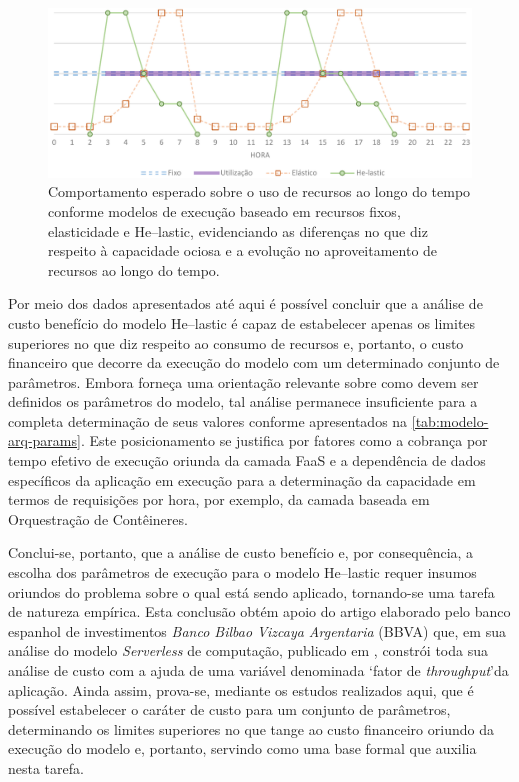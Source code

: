 \documentclass[english,brazilian]{UNISINOSmonografia} %
\newcommand\defaultFigureWidth{0.9}
\begin{document}
\begin{figure}[tb]
	\centering%
	\begin{minipage}{\defaultFigureWidth\textwidth}
		\caption{Comportamento esperado sobre o uso de recursos ao longo do tempo conforme modelos de execução baseado em recursos fixos, elasticidade e \textsf{He}--lastic, evidenciando as diferenças no que diz respeito à capacidade ociosa e a evolução no aproveitamento de recursos ao longo do tempo.}
		\label{fig:modelo-custben-alternativas}
		\includegraphics[width=\textwidth]{modelo-custben-alternativas}
	\end{minipage}
\end{figure}


Por meio dos dados apresentados até aqui é possível concluir que a análise de custo benefício do modelo \textsf{He}--lastic é capaz de estabelecer apenas os limites superiores no que diz respeito ao consumo de recursos e, portanto, o custo financeiro que decorre da execução do modelo com um determinado conjunto de parâmetros.
Embora forneça uma orientação relevante sobre como devem ser definidos os parâmetros do modelo, tal análise permanece insuficiente para a completa determinação de seus valores conforme apresentados na \autoref{tab:modelo-arq-params}.
Este posicionamento se justifica por fatores como a cobrança por tempo efetivo de execução oriunda da camada FaaS e a dependência de dados específicos da aplicação em execução para a determinação da capacidade em termos de requisições por hora, por exemplo, da camada baseada em Orquestração de Contêineres.


Conclui-se, portanto, que a análise de custo benefício e, por consequência, a escolha dos parâmetros de execução para o modelo \textsf{He}--lastic requer insumos oriundos do problema sobre o qual está sendo aplicado, tornando-se uma tarefa de natureza empírica.
Esta conclusão obtém apoio do artigo elaborado pelo banco espanhol de investimentos \textit{Banco Bilbao Vizcaya Argentaria} (BBVA) que, em sua análise do modelo \textit{Serverless} de computação, publicado em , constrói toda sua análise de custo com a ajuda de uma variável denominada \textquoteleft fator de \textit{throughput}\textquoteright  da aplicação. 
Ainda assim, prova-se, mediante os estudos realizados aqui, que é possível estabelecer o caráter de custo para um conjunto de parâmetros, determinando os limites superiores no que tange ao custo financeiro oriundo da execução do modelo e, portanto, servindo como uma base formal que auxilia nesta tarefa.
\end{document}
